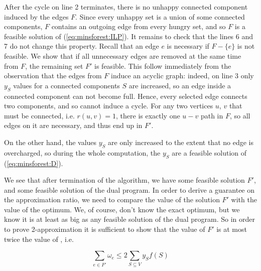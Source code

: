 \begin{dokaz}
After the cycle on line 2 terminates, there is no unhappy connected component induced by the edges $F$. Since 
every unhappy set is a union of some connected components, $F$ contains an outgoing edge from
every hungry set, and so $F$ is a feasible solution of  (\ref{eq:minsforest:ILP}).
It remains to check that the lines 6 and 7 do not change this property.
Recall that an edge $e$ is necessary if $F-\{e\}$ is not feasible. We show that if all unnecessary
edges are removed at the same time from $F$, the remaining set $F'$ is feasible. This follow immediately
from the observation that the edges from $F$ induce an acyclic graph: indeed, on line 3 only $y_S$ values for
a connected components $S$ are increased, so an edge inside a connected component can not become full. Hence,
every selected edge connects two components, and so cannot induce a cycle. For any two vertices  $u$, $v$
that must be connected, i.e. $r(u,v)=1$, there is exactly one $u-v$ path in $F$, so all edges on it are 
necessary, and thus end up in $F'$.

On the other hand, the values $y_S$ are only increased to the extent that no edge is overcharged, so
during the whole computation, the $y_S$ are a feasible solution of  (\ref{eq:minsforest:D}).
\end{dokaz}

\noindent 
We see that after termination of the algorithm, we have some feasible solution $F'$, and some
feasible solution  of the dual program. In order to derive a guarantee on the approximation ratio, we need
to compare the value of the solution $F'$ with the value of the optimum. We, of course, don't know the exact optimum,
but we know it is at least as big as any feasible solution of the dual program. So in order to prove
2-approximation it is sufficient to show that the value of $F'$ is at most twice the value of , i.e.


\begin{veta}
  $$\sum_{e\in F'}\omega_e \le 2 \sum_{S\subseteq V}y_Sf(S)$$
\end{veta}

